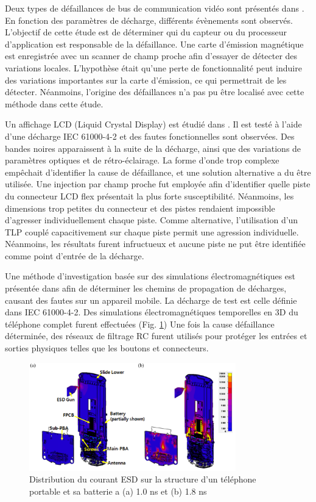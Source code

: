 Deux types de défaillances de bus de communication vidéo sont présentés dans \cite{softFailSubsystem}.
En fonction des paramètres de décharge, différents évènements sont observés.
L'objectif de cette étude est de déterminer qui du capteur ou du processeur d'application est responsable de la défaillance.
Une carte d'émission magnétique est enregistrée avec un scanner de champ proche afin d'essayer de détecter des variations locales.
L'hypothèse était qu'une perte de fonctionnalité peut induire des variations importantes sur la carte d'émission, ce qui permettrait de les détecter.
Néanmoins, l'origine des défaillances n'a pas pu être localisé avec cette méthode dans cette étude.

Un affichage LCD (Liquid Crystal Display) est étudié dans \cite{softFailLCD}.
Il est testé à l'aide d'une décharge IEC 61000-4-2 \cite{iec61000-4-2} et des fautes fonctionnelles sont observées.
Des bandes noires apparaissent à la suite de la décharge, ainsi que des variations de paramètres optiques et de rétro-éclairage.
La forme d'onde trop complexe empêchait d'identifier la cause de défaillance, et une solution alternative a du être utilisée.
Une injection par champ proche fut employée afin d'identifier quelle piste du connecteur LCD flex présentait la plus forte susceptibilité.
Néanmoins, les dimensions trop petites du connecteur et des pistes rendaient impossible d'agresser individuellement chaque piste.
Comme alternative, l'utilisation d'un TLP couplé capacitivement sur chaque piste permit une agression individuelle.
Néanmoins, les résultats furent infructueux et aucune piste ne put être identifiée comme point d'entrée de la décharge.

Une méthode d'investigation basée sur des simulations électromagnétiques est présentée dans \cite{softFailMobile} afin de déterminer les chemins de propagation de décharges, causant des fautes sur un appareil mobile.
La décharge de test est celle définie dans IEC 61000-4-2.
Des simulations électromagnétiques temporelles en 3D du téléphone complet furent effectuées (Fig. \ref{fig:mobile-phone-3d-em})
Une fois la cause défaillance déterminée, des réseaux de filtrage RC furent utilisés pour protéger les entrées et sorties physiques telles que les boutons et connecteurs.

\begin{figure}[!h]
  \centering
  \includegraphics[width=0.8\textwidth]{src/1/figures/current_distribution_mobile.png}
  \caption{Distribution du courant ESD sur la structure d'un téléphone portable et sa batterie \cite{softFailMobile} a (a) 1.0 ns et (b) 1.8 ns}
  \label{fig:mobile-phone-3d-em}
\end{figure}

